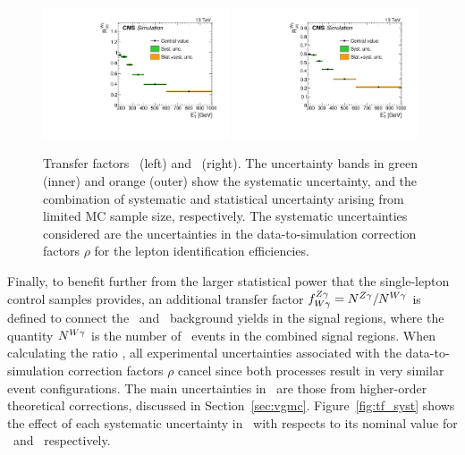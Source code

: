\begin{figure}[htbp]
  \centering
    \includegraphics[width=0.49\textwidth]{Analysis/Figures/RWe.pdf}
    \includegraphics[width=0.49\textwidth]{Analysis/Figures/RWm.pdf}
    \caption{
      Transfer factors \RWe\ (left) and \RWm\ (right). 
      The uncertainty bands in green (inner) and orange (outer) show the systematic uncertainty, and the combination of systematic and statistical uncertainty arising from limited MC sample size, respectively. 
      The systematic uncertainties considered are the uncertainties in the data-to-simulation correction factors $\rho$ for the lepton identification efficiencies.
    }
    \label{fig:tf_w}
\end{figure}

Finally, to benefit further from the larger statistical power that the single-lepton control samples provides, an additional transfer factor $f^{{Z}\gamma}_{{W}\gamma} = N^{{Z}\gamma}_{} / N^{{W}\gamma}_{}$ is defined to connect the \zinvg\ and \wlng\ background yields in the signal regions, where the quantity $N^{{W}\gamma}_{}$ is the number of \wlng\ events in the combined signal regions. 
When calculating the ratio \fZW, all experimental uncertainties associated with the data-to-simulation correction factors $\rho$ cancel since both processes result in very similar event configurations. 
The main uncertainties in \fZW\ are those from higher-order theoretical corrections, discussed in Section~\ref{sec:vgmc}. Figure~\ref{fig:tf_syst} shows the effect of each systematic uncertainty in \fZW\ with respects to its nominal value for \zinvg\ and \wlng\ respectively.

